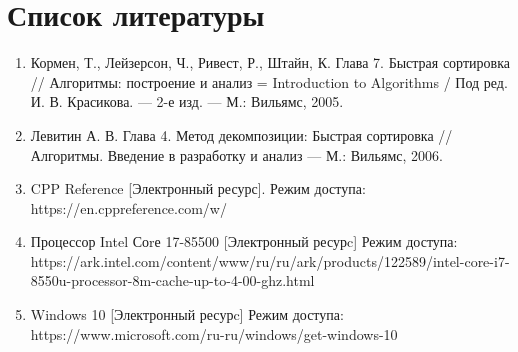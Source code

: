 \documentclass[12pt]{report}
\begin{document}
\chapter*{Список литературы}
\begin{enumerate}
    \item  Кормен, Т., Лейзерсон, Ч., Ривест, Р., Штайн, К. Глава 7. Быстрая сортировка // Алгоритмы: построение и анализ = Introduction to Algorithms / Под ред. И. В. Красикова. — 2-е изд. — М.: Вильямс, 2005.
    \item Левитин А. В. Глава 4. Метод декомпозиции: Быстрая сортировка // Алгоритмы. Введение в разработку и анализ — М.: Вильямс, 2006. 
    \item CPP Reference [Электронный ресурс]. Режим доступа: https://en.cppreference.com/w/
    \item Процессор Intel Соrе 17-85500 [Электронный ресурc] Режим доступа: https://ark.intel.com/content/www/ru/ru/ark/products/122589/intel-core-i7-8550u-processor-8m-cache-up-to-4-00-ghz.html
    \item Windows 10 [Электронный ресурc] Режим доступа: https://www.microsoft.com/ru-ru/windows/get-windows-10
\end{enumerate}
\end{document}
